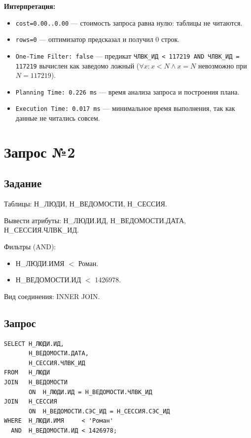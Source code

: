 \documentclass[12pt,a4paper]{article}
\begin{document}
\textbf{Интерпретация:}
\begin{itemize}
  \item \texttt{cost=0.00..0.00} --- стоимость запроса равна нулю: таблицы не читаются.
  \item \texttt{rows=0} --- оптимизатор предсказал и получил 0 строк.
  \item \texttt{One-Time Filter: false} --- предикат
        \texttt{ЧЛВК\_ИД < 117219 AND ЧЛВК\_ИД = 117219} вычислен как заведомо
        ложный ($\forall x: x < N \land x = N$ невозможно при $N = 117219$).
  \item \texttt{Planning Time: 0.226 ms} --- время анализа запроса и построения плана.
  \item \texttt{Execution Time: 0.017 ms} --- минимальное время выполнения,
        так как данные не читались совсем.
\end{itemize}

\newpage

\section{Запрос №2}

\subsection{Задание}

\hspace{\parindent}Таблицы: Н\_ЛЮДИ, Н\_ВЕДОМОСТИ, Н\_СЕССИЯ.

Вывести атрибуты: Н\_ЛЮДИ.ИД, Н\_ВЕДОМОСТИ.ДАТА, Н\_СЕССИЯ.ЧЛВК\_ИД.

Фильтры (AND):
\begin{itemize}
  \item[a)] Н\_ЛЮДИ.ИМЯ $<$ Роман.
  \item[b)] Н\_ВЕДОМОСТИ.ИД $<$ 1426978.
\end{itemize}
Вид соединения: INNER JOIN.

\subsection{Запрос}

\begin{lstlisting}[style=sql]
SELECT Н_ЛЮДИ.ИД,
       Н_ВЕДОМОСТИ.ДАТА,
       Н_СЕССИЯ.ЧЛВК_ИД
FROM   Н_ЛЮДИ
JOIN   Н_ВЕДОМОСТИ
       ON  Н_ЛЮДИ.ИД = Н_ВЕДОМОСТИ.ЧЛВК_ИД
JOIN   Н_СЕССИЯ
       ON  Н_ВЕДОМОСТИ.СЭС_ИД = Н_СЕССИЯ.СЭС_ИД
WHERE  Н_ЛЮДИ.ИМЯ     < 'Роман'
  AND  Н_ВЕДОМОСТИ.ИД < 1426978;
\end{lstlisting}
\end{document}
